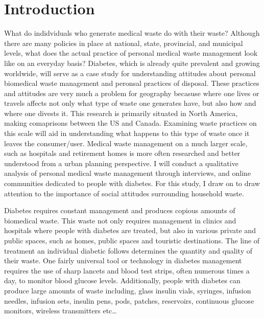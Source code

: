 \documentclass[12pt]{article}
\begin{document}
\section{Introduction}
\doublespacing
What do indidviduals who generate medical waste do with their waste? Although there are many policies in place at national, state, provincial, and municipal levels, what does the actual practice of personal medical waste management look like on an everyday basis? Diabetes, which is already quite prevalent and growing worldwide, will serve as a case study for understanding attitudes about personal biomedical waste management and peronsal practices of disposal. These practices and attitudes are very much a problem for geography becasuse where one lives or travels affects not only what type of waste one generates have, but also how and where one divests it. This research is primarily situated in North America, making comaprisons between the US and Canada. Examining waste practices on this scale will aid in understanding what happens to this type of waste once it leaves the consumer/user. Medical waste management on a much larger scale, such as hospitals and retirement homes is more often researched and better understood from a urban planning perspective. I will conduct a qualitative analysis of personal medical waste management through interviews, and online communities dedicated to people with diabetes. For this study, I draw on \citet{barr_household_2002} to draw attention to the importance of social attitudes surrounding household waste.

Diabetes requires constant management and produces copious amounts of biomedical waste. This waste not only requires management in clinics and hospitals where people with diabetes are treated, but also in various private and public spaces, such as homes, public spaces and touristic destinations. The line of treatment an individual diabetic follows determines the quantity and quality of their waste. One fairly universal tool or technology in diabetes management requires the use of sharp lancets and blood test strips, often numerous times a day, to monitor blood glucose levels. Additionally, people with diabetes can produce large amounts of waste including, glass insulin vials, syringes, infusion needles, infusion sets, insulin pens, pods, patches, reservoirs, continuous glucose monitors, wireless transmitters etc… 
\end{document}
